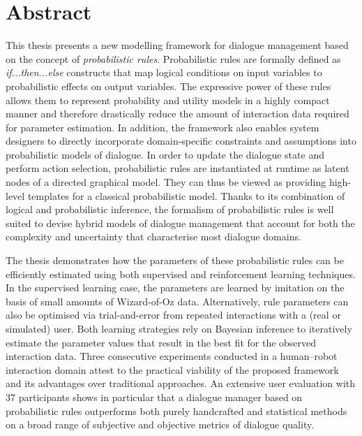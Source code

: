 \chapter*{Abstract}

This thesis presents a new modelling framework for dialogue management based on the concept of \textit{probabilistic rules}.  Probabilistic rules are formally defined as \textit{if...then...else} constructs that map logical conditions on input variables to probabilistic effects on output variables. The expressive power of these rules allows them to represent probability and utility models in a highly compact manner and therefore drastically reduce the amount of interaction data required for parameter estimation. In addition, the framework also enables system designers to directly incorporate domain-specific constraints and assumptions into probabilistic models of dialogue.  In order to update the dialogue state and perform action selection, probabilistic rules are instantiated at runtime as latent nodes of a directed graphical model.  They can thus be viewed as providing high-level templates for a classical probabilistic model. Thanks to its combination of logical and probabilistic inference, the formalism of probabilistic rules is well suited to devise hybrid models of dialogue management that account for both the complexity and uncertainty that characterise most dialogue domains.

The thesis demonstrates how the parameters of these probabilistic rules can be efficiently estimated using both supervised and reinforcement learning techniques. In the supervised learning case, the parameters are learned by imitation on the basis of small amounts of Wizard-of-Oz data.  Alternatively, rule parameters can also be optimised via trial-and-error from repeated interactions with a (real or simulated) user. Both learning strategies rely on Bayesian inference to iteratively estimate the parameter values that result in the best fit for the observed interaction data. Three consecutive experiments conducted in a human--robot interaction domain attest to the practical viability of the proposed framework and its advantages over traditional approaches.  An extensive user evaluation with 37 participants shows in particular that a dialogue manager based on probabilistic rules outperforms both purely handcrafted and statistical methods on a broad range of subjective and objective metrics of dialogue quality.

